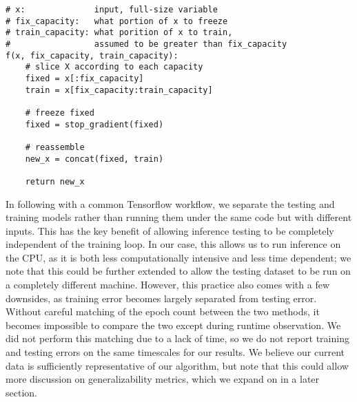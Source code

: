 \begin{lstlisting}[caption={Variable Deconstruction}, label={lst:var_deconst}, captionpos=b]
# x:              input, full-size variable
# fix_capacity:   what portion of x to freeze
# train_capacity: what porition of x to train,
#                 assumed to be greater than fix_capacity
f(x, fix_capacity, train_capacity):
    # slice X according to each capacity
    fixed = x[:fix_capacity]
    train = x[fix_capacity:train_capacity]

    # freeze fixed
    fixed = stop_gradient(fixed)

    # reassemble 
    new_x = concat(fixed, train)

    return new_x
\end{lstlisting}

In following with a common Tensorflow workflow, we separate the testing and training models rather than running them under the same code but with different inputs.
This has the key benefit of allowing inference testing to be completely independent of the training loop.
In our case, this allows us to run inference on the CPU, as it is both less computationally intensive and less time dependent; we note that this could be further extended to allow the testing dataset to be run on a completely different machine.
However, this practice also comes with a few downsides, as training error becomes largely separated from testing error.
Without careful matching of the epoch count between the two methods, it becomes impossible to compare the two except during runtime observation.
We did not perform this matching due to a lack of time, so we do not report training and testing errors on the same timescales for our results.
We believe our current data is sufficiently representative of our algorithm, but note that this could allow more discussion on generalizability metrics, which we expand on in a later section.